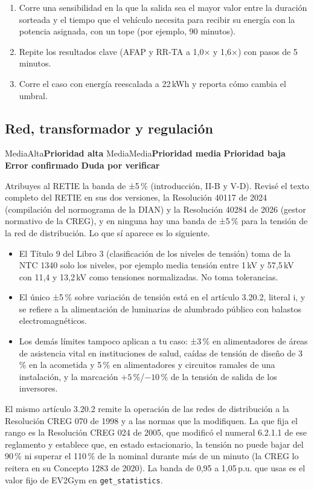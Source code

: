 \documentclass[11pt]{article}
\newcommand{\prioridad}[1]{%
  \def\tmpA{Alta}\def\tmpM{Media}\def\tmp{#1}%
  \ifx\tmp\tmpA\colorbox{rojoerror}{\color{white}\small\bfseries Prioridad alta}%
  \else\ifx\tmp\tmpM\colorbox{naranjatarea}{\color{white}\small\bfseries Prioridad media}%
  \else\colorbox{azulidea}{\color{white}\small\bfseries Prioridad baja}\fi\fi}
\newcommand{\confirmado}{\colorbox{rojoerror!15}{\small\bfseries\color{rojoerror} Error confirmado}}
\newcommand{\pordudar}{\colorbox{black!10}{\small\bfseries\color{black!75} Duda por verificar}}
\begin{document}
\begin{tarea}
\begin{enumerate}
\item Corre una sensibilidad en la que la salida sea el mayor valor entre la duración sorteada y el tiempo que el vehículo necesita para recibir su energía con la potencia asignada, con un tope (por ejemplo, 90 minutos).
\item Repite los resultados clave (AFAP y RR-TA a 1,0× y 1,6×) con pasos de 5 minutos.
\item Corre el caso con energía reescalada a 22\,kWh y reporta cómo cambia el umbral.
\end{enumerate}
\end{tarea}

\subsection{Red, transformador y regulación}
\prioridad{Media} \confirmado{} \pordudar

\begin{error}
Atribuyes al RETIE la banda de ±5\,\% (introducción, II-B y V-D). Revisé el texto completo del RETIE en sus dos versiones, la Resolución 40117 de 2024 (compilación del normograma de la DIAN) y la Resolución 40284 de 2026 (gestor normativo de la CREG), y en ninguna hay una banda de ±5\,\% para la tensión de la red de distribución. Lo que sí aparece es lo siguiente.
\begin{itemize}[leftmargin=1.2em]
\item El Título 9 del Libro 3 (clasificación de los niveles de tensión) toma de la NTC 1340 solo los niveles, por ejemplo media tensión entre 1\,kV y 57,5\,kV con 11,4 y 13,2\,kV como tensiones normalizadas. No toma tolerancias.
\item El único ±5\,\% sobre variación de tensión está en el artículo 3.20.2, literal i, y se refiere a la alimentación de luminarias de alumbrado público con balastos electromagnéticos.
\item Los demás límites tampoco aplican a tu caso: ±3\,\% en alimentadores de áreas de asistencia vital en instituciones de salud, caídas de tensión de diseño de 3\,\% en la acometida y 5\,\% en alimentadores y circuitos ramales de una instalación, y la marcación $+5$\,\%/$-10$\,\% de la tensión de salida de los inversores.
\end{itemize}
El mismo artículo 3.20.2 remite la operación de las redes de distribución a la Resolución CREG 070 de 1998 y a las normas que la modifiquen. La que fija el rango es la Resolución CREG 024 de 2005, que modificó el numeral 6.2.1.1 de ese reglamento y establece que, en estado estacionario, la tensión no puede bajar del 90\,\% ni superar el 110\,\% de la nominal durante más de un minuto (la CREG lo reitera en su Concepto 1283 de 2020). La banda de 0,95 a 1,05\,p.u. que usas es el valor fijo de EV2Gym en \texttt{get\_statistics}.
\end{error}
\end{document}
